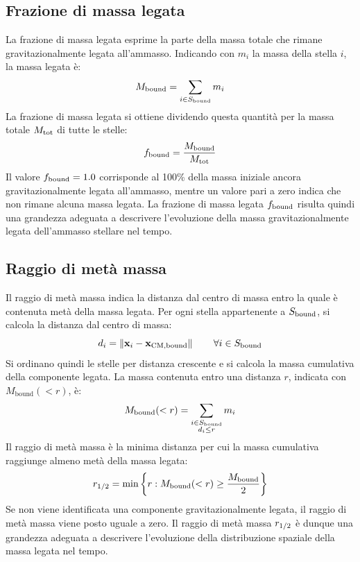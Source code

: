 \subsection{Frazione di massa legata}
\label{subsec:frazione-massa-legata}
La frazione di massa legata esprime la parte della massa totale che rimane gravitazionalmente legata all'ammasso. Indicando con $m_i$ la massa della stella $i$, la massa legata è:
\begin{equation}
	M_{\mathrm{bound}} = \sum_{i\in S_{\mathrm{bound}}}m_i
	\label{eq:bound-mass}
\end{equation}
La frazione di massa legata si ottiene dividendo questa quantità per la massa totale $M_{\mathrm{tot}}$ di tutte le stelle:
\begin{equation}
	f_{\mathrm{bound}} =
	\frac{M_{\mathrm{bound}}}{M_{\mathrm{tot}}}
	\label{eq:bound-mass-fraction}
\end{equation}
Il valore $f_{\mathrm{bound}}=1.0$ corrisponde al 100\% della massa iniziale ancora gravitazionalmente legata all'ammasso, mentre un valore pari a zero indica che non rimane alcuna massa legata.
La frazione di massa legata $f_{\mathrm{bound}}$ risulta quindi una grandezza adeguata a descrivere l'evoluzione della massa gravitazionalmente legata dell'ammasso stellare nel tempo.
\subsection{Raggio di metà massa}
\label{subsec:raggio-meta-massa}
Il raggio di metà massa indica la distanza dal centro di massa entro la quale è contenuta metà della massa legata. Per ogni stella appartenente a $S_{\mathrm{bound}}$, si calcola la distanza dal centro di massa:
\begin{equation}
	d_i =
	\left\|\mathbf{x}_i-\mathbf{x}_{\mathrm{CM,bound}}\right\|
	\qquad \forall i\in S_{\mathrm{bound}}
	\label{eq:stellar-distance}
\end{equation}
Si ordinano quindi le stelle per distanza crescente e si calcola la massa cumulativa della componente legata. La massa contenuta entro una distanza $r$, indicata con $M_{\mathrm{bound}}(<r)$, è:
\begin{equation}
	M_{\mathrm{bound}}(<r) = \sum_{\substack{i\in S_{\mathrm{bound}}\\d_i\leq r}}m_i
	\label{eq:cumulative-bound-mass}
\end{equation}
Il raggio di metà massa è la minima distanza per cui la massa cumulativa raggiunge almeno metà della massa legata:
\begin{equation}
	r_{1/2} = \min\left\{r : M_{\mathrm{bound}}(<r)\geq\frac{M_{\mathrm{bound}}}{2}\right\}
	\label{eq:half-mass-radius}
\end{equation}
Se non viene identificata una componente gravitazionalmente legata, il raggio di metà massa viene posto uguale a zero.
Il raggio di metà massa $r_{1/2}$ è dunque una grandezza adeguata a descrivere l'evoluzione della distribuzione spaziale della massa legata nel tempo.